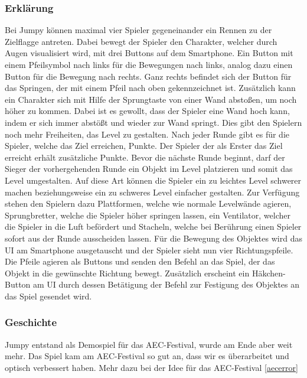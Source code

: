 \subsubsection{Erklärung}
Bei Jumpy können maximal vier Spieler gegeneinander ein Rennen zu der Zielflagge antreten. Dabei bewegt der Spieler den Charakter, welcher durch Augen visualisiert wird, mit drei Buttons auf dem Smartphone. Ein Button mit einem Pfeilsymbol nach links für die Bewegungen nach links, analog dazu einen Button für die Bewegung nach rechts. Ganz rechts befindet sich der Button für das Springen, der mit einem Pfeil nach oben gekennzeichnet ist. Zusätzlich kann ein Charakter sich mit Hilfe der Sprungtaste von einer Wand abstoßen, um noch höher zu kommen. Dabei ist es gewollt, dass der Spieler eine Wand hoch kann, indem er sich immer abstößt und wieder zur Wand springt. Dies gibt den Spielern noch mehr Freiheiten, das Level zu gestalten. Nach jeder Runde gibt es für die Spieler, welche das Ziel erreichen, Punkte. Der Spieler der als Erster das Ziel erreicht erhält zusätzliche Punkte. Bevor die nächste Runde beginnt, darf der Sieger der vorhergehenden Runde ein Objekt im Level platzieren und somit das Level umgestalten. Auf diese Art können die Spieler ein zu leichtes Level schwerer machen beziehungsweise ein zu schweres Level einfacher gestalten.
Zur Verfügung stehen den Spielern dazu Plattformen, welche wie normale Levelwände agieren, Sprungbretter, welche die Spieler höher springen lassen, ein Ventilator, welcher die Spieler in die Luft befördert und Stacheln, welche bei Berührung einen Spieler sofort aus der Runde ausscheiden lassen. Für die Bewegung des Objektes wird das UI am Smartphone ausgetauscht und der Spieler sieht nun vier Richtungspfeile. Die Pfeile agieren als Buttons und senden den Befehl an das Spiel, der das Objekt in die gewünschte Richtung bewegt. Zusätzlich erscheint ein Häkchen-Button am UI durch dessen Betätigung der Befehl zur Festigung des Objektes an das Spiel gesendet wird.
\subsubsection{Geschichte}
Jumpy entstand als Demospiel für das AEC-Festival, wurde am Ende aber weit mehr. Das Spiel kam am AEC-Festival so gut an, dass wir es überarbeitet und optisch verbessert haben. 
Mehr dazu bei der Idee für das AEC-Festival \ref{aecerror}
